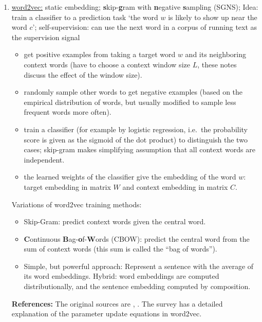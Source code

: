 \documentclass[11pt, a4paper]{amsart}
\begin{document}
\begin{enumerate}
    \item \underline{word2vec:}
    \newline
    static embedding;
    \textbf{s}kip-\textbf{g}ram with \textbf{n}egative \textbf{s}ampling (SGNS);
    Idea: train a classifier to a prediction task `the word $w$ is likely to show up near the word $c$';
    self-supervision: can use the next word in a corpus of running text as the supervision signal
    \begin{itemize}
        \item get positive examples from taking a target word $w$ and its neighboring context words (have to choose a context window size $L$, these notes \cite{DBLP:journals/corr/Goldberg15c} discuss the effect of the window size).
        \item randomly sample other words to get negative examples (based on the empirical distribution of words, but usually modified to sample less frequent words more often).
        \item train a classifier (for example by logistic regression, i.e.\ the probability score is given as the sigmoid of the dot product) to distinguish the two cases;
        skip-gram makes simplifying assumption that all context words are independent.
        \item the learned weights of the classifier give the embedding of the word $w$:
        target embedding in matrix $W$ and context embedding in matrix $C$.
    \end{itemize}
    Variations of word2vec training methods:
    \begin{itemize}
        \item Skip-Gram:
        predict context words given the central word.
        \item \textbf{C}ontinuous \textbf{B}ag-\textbf{o}f-\textbf{W}ords (CBOW):
        predict the central word from the sum of context words (this sum is called the ``bag of words'').
        \item Simple, but powerful approach:
        Represent a sentence with the average of its word embeddings.
        Hybrid: word embeddings are computed distributionally, and the sentence embedding computed by composition.
    \end{itemize}
    \textbf{References:}
    The original sources are
    \cite{DBLP:journals/corr/abs-1301-3781},
    \cite{DBLP:journals/corr/MikolovSCCD13}.
    The survey \cite{DBLP:journals/corr/Rong14} has a detailed explanation of the parameter update equations in word2vec.
    \newline

\end{enumerate}
\end{document}
